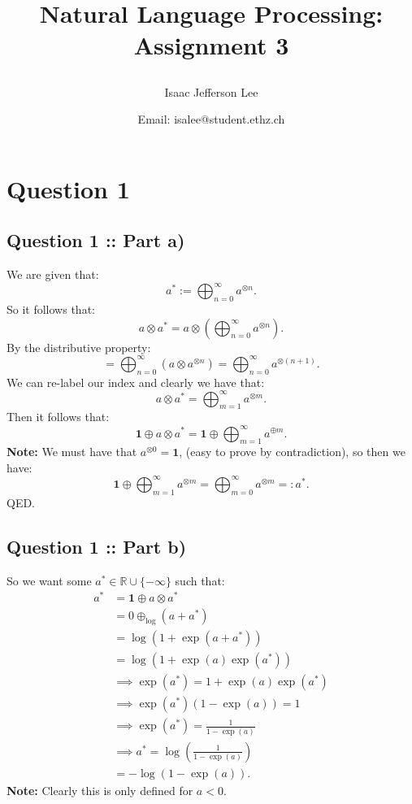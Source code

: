 \documentclass[a4paper]{article}
\title{Natural Language Processing: Assignment 3\author{Isaac Jefferson Lee}\date{Email: isalee@student.ethz.ch}}
\begin{document}
\maketitle
\thispagestyle{fancy} 

\section*{Question 1}

\subsection*{Question 1 :: Part a)}
We are given that:
\[
    a^* := \bigoplus_{n=0}^\infty a^{\otimes n}
.\]
So it follows that:
\[
a \otimes a^* = a \otimes \left( \bigoplus_{n=0}^\infty a^{\otimes n} \right) 
.\]
By the distributive property:
\[
    = \bigoplus_{n=0}^\infty (a \otimes a^{\otimes n}) = \bigoplus_{n=0}^\infty a^{\otimes (n+1)}
.\]
We can re-label our index and clearly we have that:
\[
a \otimes a^* = \bigoplus_{m=1}^\infty a^{\otimes m}
.\]
Then it follows that:
\[
\bm{1} \oplus a \otimes a^* = \bm{1} \oplus \bigoplus_{m=1}^\infty a^{\oplus m}
.\]
\textbf{Note:} We must have that $a^{\otimes 0} = \bm{1}$, (easy to prove
by contradiction), so then we have:
\[
    \bm{1} \oplus \bigoplus_{m=1}^\infty a^{\otimes m} = \bigoplus_{m=0}^\infty a^{\otimes m} =: a^*
.\]
QED.

\subsection*{Question 1 :: Part b)}
So we want some $a^* \in \mathbb{R} \cup \{-\infty\} $ such that:
\begin{align*}
     a^* &=  \bm{1} \oplus a \otimes a^* \\
         &= 0 \oplus_{\log} (a + a^*)\\ 
 &=  \log(1 + \exp(a + a^*))\\ 
 &=  \log(1 + \exp(a)\exp(a^*))\\ 
 &\implies \exp(a^*)=1 + \exp(a)\exp(a^*)\\ 
 &\implies \exp(a^*)(1 - \exp(a))=1\\ 
 &\implies \exp(a^*)=\frac{1}{1 - \exp(a)}\\ 
 &\implies a^* =  \log\left(\frac{1}{1-\exp(a)}\right) \\
 &= -\log(1 - \exp(a))
.
\end{align*}
\textbf{Note:} Clearly this is only defined for $a < 0$.
\end{document}
